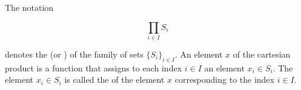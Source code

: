 The notation

$$\prod_{i \in I} S_i$$

denotes the  (or ) of the family of sets $\{S_i\}_{i \in I}$. An element $x$ of the cartesian product is a function that assigns to each index $i \in I$ an element $x_i \in S_i$. The element $x_i \in S_i$ is called the  of the element $x$ corresponding to the index $i \in I$.

